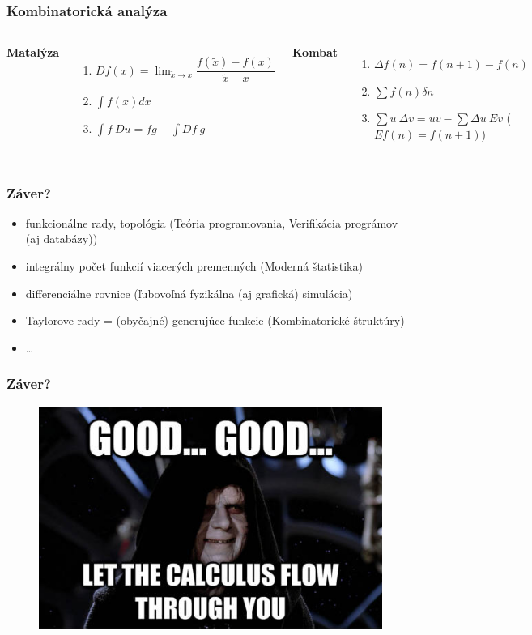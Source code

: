 \documentclass{beamer}
\begin{document}
\begin{frame}
\frametitle{Kombinatorická analýza}
\begin{columns}[c] %

\textbf{Matalýza}
\begin{enumerate}
\item<1-> $ D f(x) = \lim_{\tilde{x} \to x} \dfrac{f(\tilde{x}) - f(x)}{\tilde{x} - x}$
\item<2-> $\int f(x) dx$
\item<3-> $\int f~Du = fg - \int Df ~g $
\end{enumerate}

\textbf{Kombat}
\begin{enumerate}
\item<1-> $ \Delta f (n) = f(n+1) - f(n)$
\item<2-> $\sum f(n) \delta n$
\item<3-> $\sum u ~ \Delta v = u v - \sum \Delta u ~ Ev$ ($E f(n) = f(n+1)$)
\end{enumerate}
\end{columns}
\end{frame}

\begin{frame}
\frametitle{Záver?}
\begin{itemize}
  \item funkcionálne rady, topológia (Teória programovania, Verifikácia prográmov (aj databázy))
  \item integrálny počet funkcií viacerých premenných (Moderná štatistika)
  \item differenciálne rovnice (ľubovoľná fyzikálna (aj grafická) simulácia)
  \item Taylorove rady = (obyčajné) generujúce funkcie (Kombinatorické štruktúry)
  \item \ldots
\end{itemize}
\end{frame}

\begin{frame}
\frametitle{Záver?}
\begin{figure}
\includegraphics[height=0.8\textheight]{images/let_calculus_flow.jpg}
\end{figure}
\end{frame}
\end{document}
